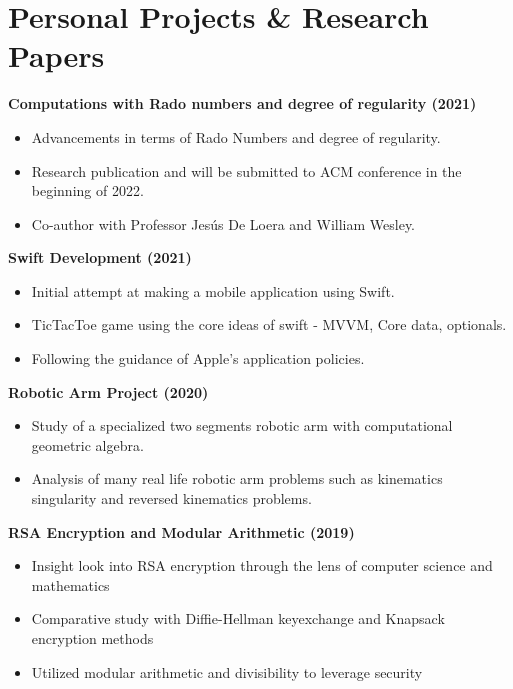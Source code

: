 \section{\sc Personal Projects \& Research Papers}

{\bf{Computations with Rado numbers and degree of regularity} (2021)}\\
\begin{itemize}
\setlength\itemsep{0em}
\item Advancements in terms of Rado Numbers and degree of regularity.
\item Research publication and will be submitted to ACM conference in the beginning of 2022.
\item Co-author with Professor Jes\'{u}s De Loera and William Wesley.
\end{itemize}

{\bf{Swift Development} (2021)}\\
\begin{itemize}
\setlength\itemsep{0em}
\item Initial attempt at making a mobile application using Swift.
\item TicTacToe game using the core ideas of swift - MVVM, Core data, optionals.
\item Following the guidance of Apple's application policies. 
\end{itemize}

{\bf{Robotic Arm Project} (2020)}\\
\begin{itemize}
\setlength\itemsep{0em}
\item Study of a specialized two segments robotic arm with computational geometric algebra.
\item Analysis of many real life robotic arm problems such as kinematics singularity and reversed kinematics problems. 
\end{itemize}

{\bf{RSA Encryption and Modular Arithmetic} (2019)}\\
\begin{itemize}
\setlength\itemsep{0em}
\item Insight look into RSA encryption through the lens of computer science and mathematics
\item Comparative study with Diffie-Hellman keyexchange and Knapsack encryption methods
\item Utilized modular arithmetic and divisibility to leverage security
\end{itemize}



\endinput